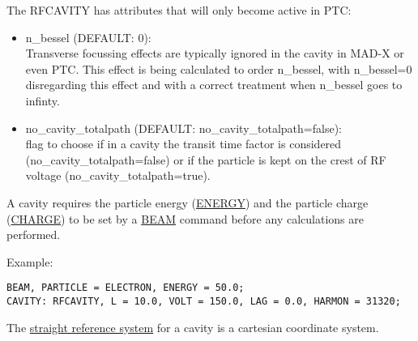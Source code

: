 The RFCAVITY has attributes that will only become active in PTC: 
\begin{itemize}
   \item n\_bessel (DEFAULT: 0): \\
     Transverse focussing effects are typically ignored in the cavity in
     MAD-X or even PTC. This effect is being calculated to order n\_bessel,
     with n\_bessel=0 disregarding this effect and with a correct treatment
     when n\_bessel goes to infinty.
   \item no\_cavity\_totalpath (DEFAULT: no\_cavity\_totalpath=false): \\
     flag to choose if in a cavity the transit time factor is considered
     (no\_cavity\_totalpath=false) or if the particle is kept on the
     crest of RF voltage (no\_cavity\_totalpath=true).  
\end{itemize}  

A cavity requires the particle energy (\href{beam.html#energy}{ENERGY})
and the particle charge (\href{beam.html#charge}{CHARGE}) to be set by a
\href{beam.html}{BEAM} command before any calculations are performed.  

 Example: 
\begin{verbatim}
BEAM, PARTICLE = ELECTRON, ENERGY = 50.0;
CAVITY: RFCAVITY, L = 10.0, VOLT = 150.0, LAG = 0.0, HARMON = 31320;
\end{verbatim} 

The \href{local_system.html#straight}{straight reference system} for a
cavity is a cartesian coordinate system.  

